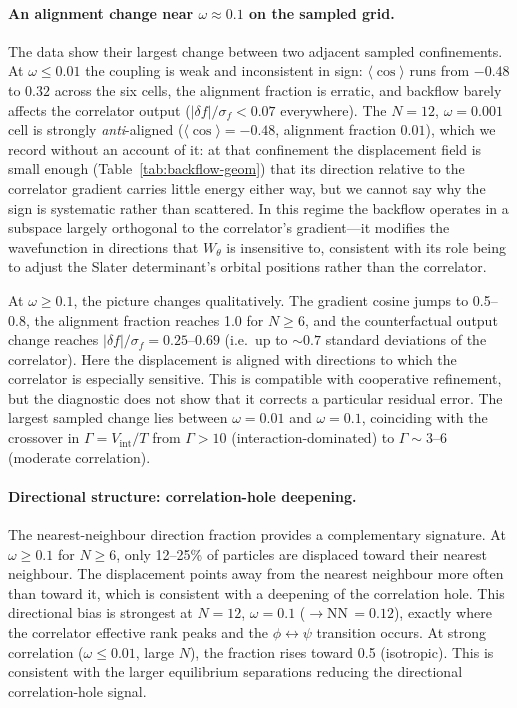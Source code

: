 \paragraph{An alignment change near $\omega\approx 0.1$ on the sampled grid.}
The data show their largest change between two adjacent sampled confinements.
At $\omega \leq 0.01$ the coupling is weak and inconsistent in sign: $\langle\cos\rangle$
runs from $-0.48$ to $0.32$ across the six cells, the alignment fraction is erratic, and
backflow barely affects the correlator output ($|\delta f|/\sigma_f < 0.07$ everywhere). The
$N{=}12$, $\omega{=}0.001$ cell is strongly \emph{anti}-aligned
($\langle\cos\rangle=-0.48$, alignment fraction $0.01$), which we record without an
account of it: at that confinement the displacement field is small enough
(Table~\ref{tab:backflow-geom}) that its direction relative to the correlator gradient
carries little energy either way, but we cannot say why the sign is systematic rather than
scattered.
In this regime the backflow operates in a subspace largely orthogonal to the correlator's gradient---it
modifies the wavefunction in directions that $W_\theta$ is insensitive to,
consistent with its role being to adjust the Slater determinant's orbital positions rather than
the correlator.

At $\omega \geq 0.1$, the picture changes qualitatively.
The gradient cosine jumps to 0.5--0.8, the alignment fraction reaches 1.0 for $N\geq 6$,
and the counterfactual output change reaches $|\delta f|/\sigma_f = 0.25$--$0.69$ (i.e.\ up to $\sim\!0.7$ standard deviations of the correlator).
Here the displacement is aligned with directions to which the correlator is especially
sensitive. This is compatible with cooperative refinement, but the diagnostic does not show
that it corrects a particular residual error.
The largest sampled change lies between $\omega=0.01$ and $\omega=0.1$,
coinciding with the crossover in $\Gamma = V_{\mathrm{int}}/T$ from $\Gamma > 10$
(interaction-dominated) to $\Gamma \sim 3$--$6$ (moderate correlation).

\paragraph{Directional structure: correlation-hole deepening.}
The nearest-neighbour direction fraction provides a complementary signature.
At $\omega \geq 0.1$ for $N\geq 6$, only 12--25\% of particles are displaced toward their
nearest neighbour.
The displacement points away from the nearest neighbour more often than toward it, which is
consistent with a deepening of the correlation hole.
This directional bias is strongest at $N{=}12$, $\omega{=}0.1$ ($\rightarrow$NN\,$=0.12$),
exactly where the correlator effective rank peaks and the $\phi\leftrightarrow\psi$ transition occurs.
At strong correlation ($\omega\leq 0.01$, large $N$), the fraction rises toward 0.5
(isotropic). This is consistent with the larger equilibrium separations reducing the
directional correlation-hole signal.

